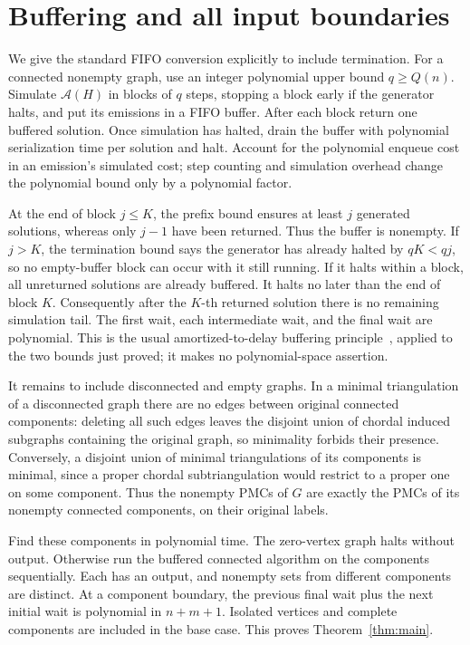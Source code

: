 \documentclass[acmsmall,12pt,screen,nonacm]{acmart}
\begin{document}
\section{Buffering and all input boundaries}\label{sec:buffer}

We give the standard FIFO conversion explicitly to include termination.
For a connected nonempty graph, use an integer polynomial upper bound
$q\ge Q(n)$. Simulate $\mathcal A(H)$ in blocks of $q$ steps, stopping a
block early if the generator halts, and put its emissions in a FIFO buffer.
After each block return one buffered solution. Once simulation has halted,
drain the buffer with polynomial serialization time per solution and halt.
Account for the polynomial enqueue cost in an emission's simulated cost;
step counting and simulation overhead change the polynomial bound only by a
polynomial factor.

At the end of block $j\le K$, the prefix bound ensures at least $j$
generated solutions, whereas only $j-1$ have been returned. Thus the buffer
is nonempty. If $j>K$, the termination bound says the generator has already
halted by $qK<qj$, so no empty-buffer block can occur with it still running.
If it halts within a block, all unreturned solutions are already buffered.
It halts no later than the end of block $K$. Consequently after the $K$-th
returned solution there is no remaining simulation tail. The first wait,
each intermediate wait, and the final wait are polynomial. This is the
usual amortized-to-delay buffering principle~\cite{CS23,CS26}, applied to
the two bounds just proved; it makes no polynomial-space assertion.

It remains to include disconnected and empty graphs. In a minimal
triangulation of a disconnected graph there are no edges between original
connected components: deleting all such edges leaves the disjoint union
of chordal induced subgraphs containing the original graph, so minimality
forbids their presence. Conversely, a disjoint union of minimal triangulations
of its components is minimal, since a proper chordal subtriangulation would
restrict to a proper one on some component. Thus the nonempty PMCs of $G$
are exactly the PMCs of its nonempty connected components, on their original
labels.

Find these components in polynomial time. The zero-vertex graph halts without
output. Otherwise run the buffered connected algorithm on the components
sequentially. Each has an output, and nonempty sets from different components
are distinct. At a component boundary, the previous final wait plus the next
initial wait is polynomial in $n+m+1$. Isolated vertices and complete
components are included in the base case. This proves Theorem~\ref{thm:main}.
\end{document}

